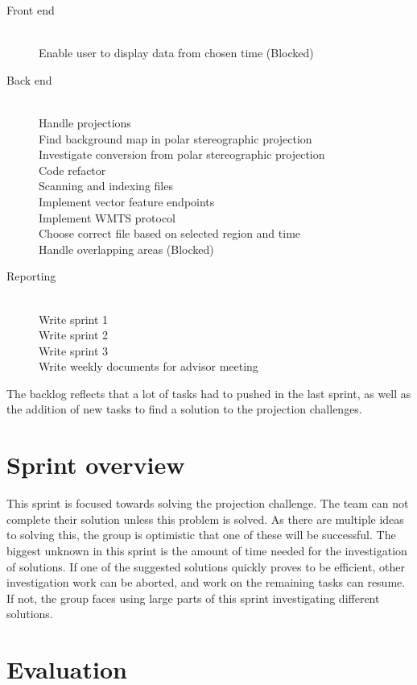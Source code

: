 \documentclass[11pt,a4paper,titlepage,oneside]{report}
\begin{document}
\begin{description}
	\item[Front end] \hfill \\
	Enable user to display data from chosen time (Blocked)
	\item[Back end] \hfill \\
	Handle projections \hfill \\
	Find background map in polar stereographic projection \hfill \\ 
	Investigate conversion from polar stereographic projection \hfill \\
	Code refactor \hfill \\
	Scanning and indexing files \hfill \\
	Implement vector feature endpoints \hfill \\
	Implement WMTS protocol \hfill \\
	Choose correct file based on selected region and time \hfill \\
	Handle overlapping areas (Blocked) \hfill \\
	\item[Reporting] \hfill \\
	Write sprint 1 \hfill \\
	Write sprint 2 \hfill \\
	Write sprint 3 \hfill \\
	Write weekly documents for advisor meeting
\end{description}

The backlog reflects that a lot of tasks had to pushed in the last sprint, as well as the addition of new tasks to find a solution to the projection challenges. 

\section{Sprint overview}
This sprint is focused towards solving the projection challenge. The team can not complete their solution unless this problem is solved. As there are multiple ideas to solving this, the group is optimistic that one of these will be successful. The biggest unknown in this sprint is the amount of time needed for the investigation of solutions. If one of the suggested solutions quickly proves to be efficient, other investigation work can be aborted, and work on the remaining tasks can resume. If not, the group faces using large parts of this sprint investigating different solutions.

\section{Evaluation}
\end{document}
